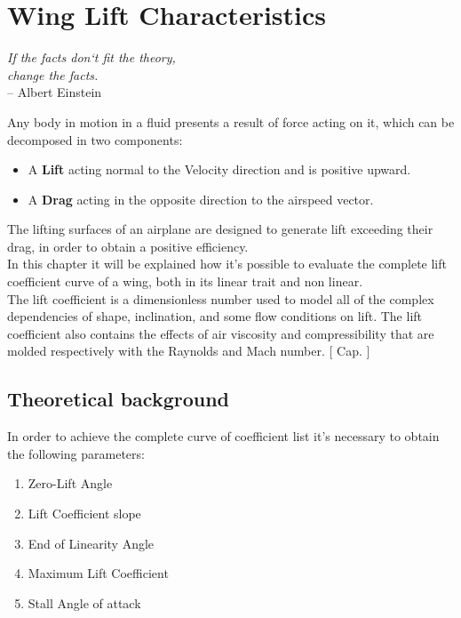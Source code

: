\chapter{Wing Lift Characteristics}
\label{ch:worklift}

\begin{flushright}
	{\smaller
		\textit{If the facts don`t fit the theory,\\change the facts. }\\
		-- Albert Einstein}
\end{flushright}


Any body in motion in a fluid presents a result of force acting on it, which can be decomposed in two components:
\begin{itemize}
\item A {\bfseries Lift} acting normal to the Velocity direction and is positive upward.
\item A {\bfseries Drag} acting in the opposite direction to the airspeed vector.
\end{itemize}
The lifting surfaces of an airplane are designed to generate lift exceeding their drag, in order to obtain a positive efficiency. \\ In this chapter it will be explained how it's possible to evaluate the complete lift coefficient curve of a wing, both in its linear trait and non linear.\\
The lift coefficient is a dimensionless number used to model all of the complex dependencies of shape, inclination, and some flow conditions on lift. The lift coefficient also contains the effects of air viscosity and compressibility that are molded respectively with the Raynolds and Mach number. [ Cap. \cite{nasaLift}] 

\section{Theoretical background}

In order to achieve the complete curve of coefficient list it's necessary to obtain the following parameters:

\begin{enumerate}
\item Zero-Lift Angle
\item Lift Coefficient slope 
\item End of Linearity Angle
\item Maximum Lift Coefficient
\item Stall Angle of attack
\end{enumerate}

